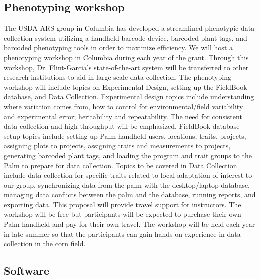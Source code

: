 \subsection*{Phenotyping workshop} %

The USDA-ARS group in Columbia has developed a streamlined phenotypic data collection system utilizing a handheld barcode device, barcoded plant tags, and barcoded phenotyping tools in order to maximize efficiency.  We will host a phenotyping workshop in Columbia during each year of the grant.  Through this workshop, Dr. Flint-Garcia's state-of-the-art system will be transferred to other research institutions to aid in large-scale data collection. The phenotyping workshop will include topics on Experimental Design, setting up the FieldBook database, and Data Collection.  Experimental design topics include understanding where variation comes from, how to control for environmental/field variability and experimental error; heritability and repeatability.  The need for consistent data collection and high-throughput will be emphasized.  FieldBook database setup topics include setting up Palm handheld users, locations, traits, projects, assigning plots to projects, assigning traits and measurements to projects,  generating barcoded plant tags, and loading the program and trait groups to the Palm to prepare for data collection.  Topics to be covered in Data Collection include data collection for specific traits related to local adaptation of interest to our group, synchronizing data from the palm with the desktop/laptop database, managing data conflicts between the palm and the database, running reports, and exporting data.  This proposal will provide travel support for instructors.  The workshop will be free but participants will be expected to purchase their own Palm handheld and pay for their own travel.  The workshop will be held each year in late summer so that the participants can gain hands-on experience in data collection in the corn field.

\subsection*{Software} %

